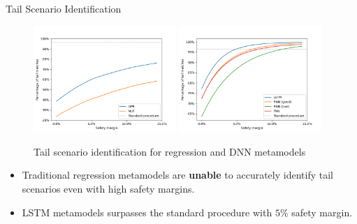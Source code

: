 \documentclass[9pt,handout]{beamer}
\begin{document}
\begin{frame}{Tail Scenario Identification}

    \begin{figure}[H]
        \includegraphics[width=0.48\textwidth]{../project2/figures/tailMatches/regLN.png}
        \includegraphics[width=0.48\textwidth]{../project2/figures/tailMatches/nnLN.png}
        \caption{Tail scenario identification for regression and DNN metamodels}
    \end{figure}

    \begin{itemize}
        \item Traditional regression metamodels are \textbf{unable} to accurately identify tail scenarios even with high safety margins.
        \item LSTM metamodels surpasses the standard procedure with $5\%$ safety margin.
    \end{itemize}
        
\end{frame}
\end{document}
